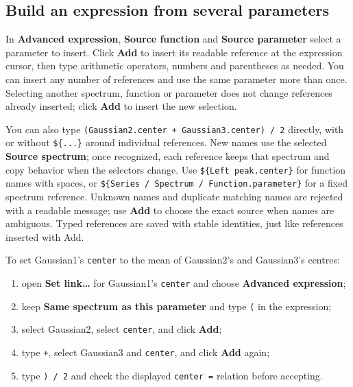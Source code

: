 \documentclass[
  10pt,
  a4paper,
  oneside]{scrreprt}
\providecommand{\tightlist}{%
  \setlength{\itemsep}{0pt}\setlength{\parskip}{0pt}}
\begin{document}
\hypertarget{build-an-expression-from-several-parameters}{%
\subsection{Build an expression from several
parameters}\label{build-an-expression-from-several-parameters}}

In \textbf{Advanced expression}, \textbf{Source function} and
\textbf{Source parameter} select a parameter to insert. Click
\textbf{Add} to insert its readable reference at the expression cursor,
then type arithmetic operators, numbers and parentheses as needed. You
can insert any number of references and use the same parameter more than
once. Selecting another spectrum, function or parameter does not change
references already inserted; click \textbf{Add} to insert the new
selection.

You can also type \texttt{(Gaussian2.center\ +\ Gaussian3.center)\ /\ 2}
directly, with or without \texttt{\$\{...\}} around individual
references. New names use the selected \textbf{Source spectrum}; once
recognized, each reference keeps that spectrum and copy behavior when
the selectors change. Use \texttt{\$\{Left\ peak.center\}} for function
names with spaces, or
\texttt{\$\{Series\ /\ Spectrum\ /\ Function.parameter\}} for a fixed
spectrum reference. Unknown names and duplicate matching names are
rejected with a readable message; use \textbf{Add} to choose the exact
source when names are ambiguous. Typed references are saved with stable
identities, just like references inserted with Add.

To set Gaussian1's \texttt{center} to the mean of Gaussian2's and
Gaussian3's centres:

\begin{enumerate}
\def\labelenumi{\arabic{enumi}.}
\tightlist
\item
  open \textbf{Set link\ldots{}} for Gaussian1's \texttt{center} and
  choose \textbf{Advanced expression};
\item
  keep \textbf{Same spectrum as this parameter} and type \texttt{(} in
  the expression;
\item
  select Gaussian2, select \texttt{center}, and click \textbf{Add};
\item
  type \texttt{+}, select Gaussian3 and \texttt{center}, and click
  \textbf{Add} again;
\item
  type \texttt{)\ /\ 2} and check the displayed \texttt{center\ =}
  relation before accepting.
\end{enumerate}
\end{document}
